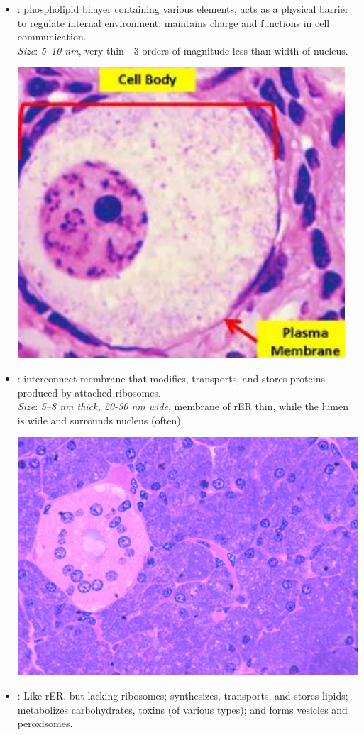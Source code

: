 \begin{multicols}{2}
\begin{itemize}
\begin{center}
  \end{center}
  \item {}: phospholipid bilayer containing various elements, acts as a physical barrier to regulate internal environment; maintains charge and functions in cell communication. \\
  \textit{Size}: \emph{5--10 \si{nm}}, very thin---3 orders of magnitude less than width of nucleus.
  \begin{center}
    \hspace{-30pt}\includegraphics[width=0.65\columnwidth]{images/week-1-plasma.png}
  \end{center}
  \item {}: interconnect membrane that modifies, transports, and stores proteins produced by attached ribosomes. \\
  \textit{Size}: \emph{5--8 \si{nm} thick, \emph{20-30 \si{nm} wide}}, membrane of rER thin, while the lumen is wide and surrounds nucleus (often).
  \begin{center}
    \hspace{-30pt}\includegraphics[width=0.65\columnwidth]{images/week-1-rer.png}
  \end{center}
  \item {}: Like rER, but lacking ribosomes; synthesizes, transports, and stores lipids; metabolizes carbohydrates, toxins (of various types); and forms vesicles and peroxisomes.\\

\end{itemize}
\end{multicols}
